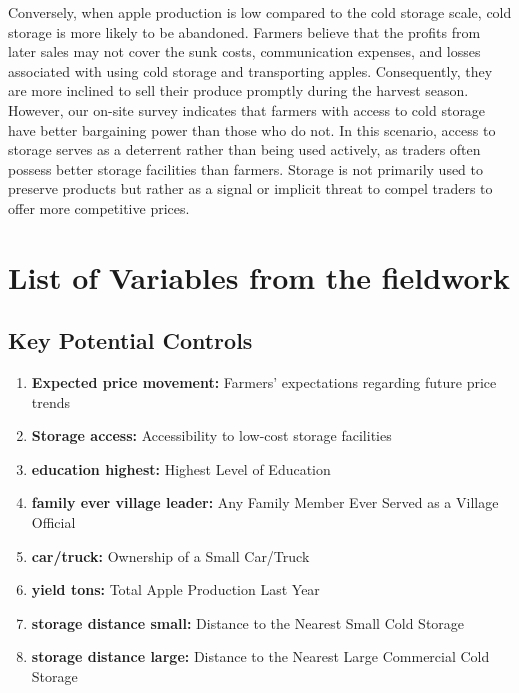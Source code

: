 \documentclass[12pt]{article}
\begin{document}
Conversely, when apple production is low compared to the cold storage scale, cold storage is more likely to be abandoned. Farmers believe that the profits from later sales may not cover the sunk costs, communication expenses, and losses associated with using cold storage and transporting apples. Consequently, they are more inclined to sell their produce promptly during the harvest season. However, our on-site survey indicates that farmers with access to cold storage have better bargaining power than those who do not. In this scenario, access to storage serves as a deterrent rather than being used actively, as traders often possess better storage facilities than farmers. Storage is not primarily used to preserve products but rather as a signal or implicit threat to compel traders to offer more competitive prices.







\section{List of Variables from the fieldwork}


\subsection{Key Potential Controls}
\begin{enumerate}
    \item \textbf{Expected price movement:} Farmers’ expectations regarding future price trends
    \item \textbf{Storage access:} Accessibility to low-cost storage facilities
    \item \textbf{education highest:} Highest Level of Education
    \item \textbf{family ever village leader:} Any Family Member Ever Served as a Village Official
    \item \textbf{car/truck:} Ownership of a Small Car/Truck
    \item \textbf{yield tons:} Total Apple Production Last Year
    \item \textbf{storage distance small:} Distance to the Nearest Small Cold Storage
    \item \textbf{storage distance large:} Distance to the Nearest Large Commercial Cold Storage
\end{enumerate}
\end{document}
